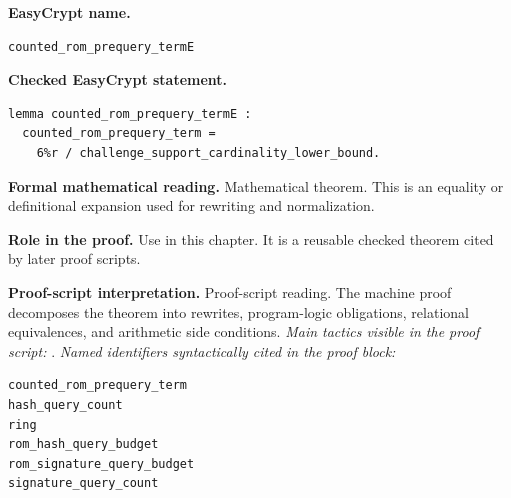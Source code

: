 \begin{formaltheorem}
\noindent\textbf{EasyCrypt name.}
\begin{lstlisting}[language=EasyCrypt,basicstyle=\ttfamily\scriptsize]
counted_rom_prequery_termE
\end{lstlisting}
\noindent\textbf{Checked EasyCrypt statement.}
\begin{lstlisting}[language=EasyCrypt,basicstyle=\ttfamily\scriptsize]
lemma counted_rom_prequery_termE :
  counted_rom_prequery_term =
    6%r / challenge_support_cardinality_lower_bound.
\end{lstlisting}
\noindent\textbf{Formal mathematical reading.}
Mathematical theorem. This is an equality or definitional expansion used for rewriting and normalization.

\noindent\textbf{Role in the proof.}
Use in this chapter. It is a reusable checked theorem cited by later proof scripts.

\noindent\textbf{Proof-script interpretation.}
Proof-script reading. The machine proof decomposes the theorem into rewrites, program-logic obligations, relational equivalences, and arithmetic side conditions.
\emph{Main tactics visible in the proof script:} .
\emph{Named identifiers syntactically cited in the proof block:}
\begin{lstlisting}[language=EasyCrypt,basicstyle=\ttfamily\scriptsize]
counted_rom_prequery_term
hash_query_count
ring
rom_hash_query_budget
rom_signature_query_budget
signature_query_count
\end{lstlisting}

\end{formaltheorem}

